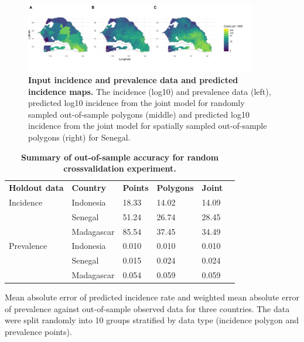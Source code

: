 \documentclass[10pt,letterpaper]{article}
\newlength\savedwidth
\newcommand\thickhline{\noalign{\global\savedwidth\arrayrulewidth\global\arrayrulewidth 2pt}%
\hline
\noalign{\global\arrayrulewidth\savedwidth}}
\begin{document}
\begin{figure}[!h]
\includegraphics[width = 0.9\textwidth]{figures/sen_both_cv12_preds.png}
\caption{{\bf Input incidence and prevalence data and predicted incidence maps. } 
The incidence (log10) and prevalence data (left), predicted log10 incidence from the joint model for randomly sampled out-of-sample polygons (middle) and predicted log10 incidence from the joint model for spatially sampled out-of-sample polygons (right) for Senegal.
}
\label{predobsmapsen}
\end{figure}



\begin{table}[!ht]
\begin{adjustwidth}{-2.25in}{0in} %
\centering
\caption{
{\bf Summary of out-of-sample accuracy for random crossvalidation experiment.}}
\begin{tabular}{llllll}
\hline
{\bf Holdout data} & {\bf Country} &  {\bf Points} & {\bf Polygons} & {\bf Joint} \\
\thickhline 
Incidence & Indonesia & 18.33 & 14.02 &  14.09\\
& Senegal & 51.24 & 26.74 &  28.45\\
& Madagascar & 85.54 & 37.45 &  34.49\vspace{3mm}\\
Prevalence & Indonesia & 0.010 & 0.010 &  0.010\\
& Senegal & 0.015 & 0.024 &  0.024\\
& Madagascar & 0.054 & 0.059 &  0.059\\
\end{tabular}
\begin{flushleft}
Mean absolute error of predicted incidence rate and weighted mean absolute error of prevalence against out-of-sample observed data for three countries.
The data were split randomly into 10 groups stratified by data type (incidence polygon and prevalence points).
\end{flushleft}
\label{table1}
\end{adjustwidth}
\end{table}
\end{document}
